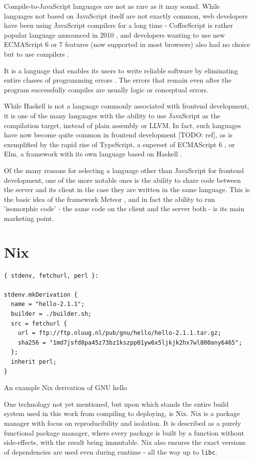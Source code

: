 \documentclass[english,odsaz]{fitthesis}
\begin{document}
Compile-to-JavaScript languages are not as rare as it may sound. While languages
not based on JavaScript itself are not exactly common, web developers have been
using JavaScript compilers for a long time - CoffeeScript is rather popular
language announced in 2010 \cite{coffeescript}, and developers wanting to use new
ECMAScript 6 or 7 features (now supported in most browsers) also had no choice
but to use compilers \cite{babel}.

It is a language that enables its users to write reliable software by
eliminating entire classes of programming errors \cite{Nanz_2015}. The errors that
remain even after the program successfully compiles are usually logic or
conceptual errors.

While Haskell is not a language commonly associated with frontend development,
it is one of the many languages with the ability to use JavaScript as the
compilation target, instead of plain assembly or LLVM. In fact, such languages
have now become quite common in frontend development [TODO: ref], as is
exemplified by the rapid rise of TypeScript, a superset of ECMAScript 6
\cite{typescript}, or Elm, a framework with its own language based on Haskell
\cite{czaplicki2012elm}.

Of the many reasons for selecting a language other than JavaScript for frontend
development, one of the more notable ones is the ability to share code between
the server and its client in the case they are written in the same
language. This is the basic idea of the framework Meteor \cite{meteor}, and in
fact the ability to run 'isomorphic code' - the same code on the client and the
server both - is its main marketing point.

\section{Nix}
\label{sec:orgedfbcd2}
\begin{listing}[htbp]
\begin{verbatim}
{ stdenv, fetchurl, perl }:

stdenv.mkDerivation {
  name = "hello-2.1.1";
  builder = ./builder.sh;
  src = fetchurl {
    url = ftp://ftp.nluug.nl/pub/gnu/hello/hello-2.1.1.tar.gz;
    sha256 = "1md7jsfd8pa45z73bz1kszpp01yw6x5ljkjk2hx7wl800any6465";
  };
  inherit perl;
}
\end{verbatim}
\caption{An example Nix derivation of GNU hello}
\end{listing}

One technology not yet mentioned, but upon which stands the entire build system
used in this work from compiling to deploying, is Nix. Nix
\cite{dolstra2006purely} is a package manager with focus on reproducibility and
isolation. It is described as a purely functional package manager, where every
package is built by a function without side-effects, with the result being
immutable. Nix also ensures the exact versions of dependencies are used even
during runtime - all the way up to \texttt{libc}.
\end{document}
